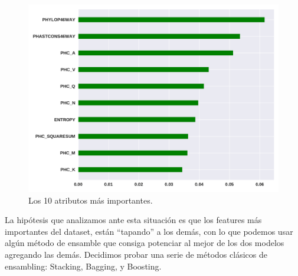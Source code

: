 \begin{figure}[H]
    \centering
    \includegraphics[scale=0.73]{documents/latex/figures/3/importance_3.pdf}
    \caption{Los 10 atributos más importantes.}
    \label{fig:importance_3}
\end{figure}

La hipótesis que analizamos ante esta situación es que los features más importantes del dataset, están ``tapando'' a los demás, con lo que podemos usar algún método de ensamble que consiga potenciar al mejor de los dos modelos agregando las demás. Decidimos probar una serie de métodos clásicos de ensambling: Stacking, Bagging, y Boosting.







